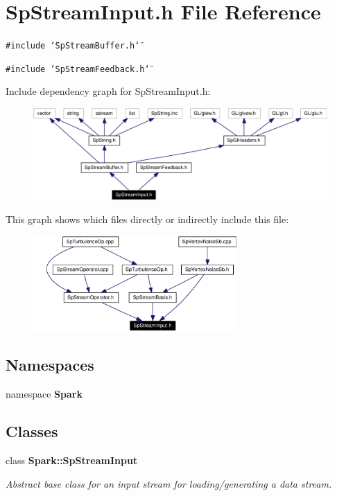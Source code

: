 \section{Sp\-Stream\-Input.h File Reference}
\label{SpStreamInput_8h}
{\tt \#include \char`\"{}Sp\-Stream\-Buffer.h\char`\"{}}\par
{\tt \#include \char`\"{}Sp\-Stream\-Feedback.h\char`\"{}}\par


Include dependency graph for Sp\-Stream\-Input.h:\begin{figure}[H]
\begin{center}
\leavevmode
\includegraphics[width=321pt]{SpStreamInput_8h__incl}
\end{center}
\end{figure}


This graph shows which files directly or indirectly include this file:\begin{figure}[H]
\begin{center}
\leavevmode
\includegraphics[width=220pt]{SpStreamInput_8h__dep__incl}
\end{center}
\end{figure}
\subsection*{Namespaces}
\begin{CompactItemize}
\item 
namespace {\bf Spark}
\end{CompactItemize}
\subsection*{Classes}
\begin{CompactItemize}
\item 
class {\bf Spark::Sp\-Stream\-Input}
\begin{CompactList}\small\item\em Abstract base class for an input stream for loading/generating a data stream. \item\end{CompactList}\end{CompactItemize}
